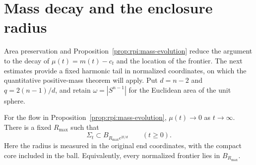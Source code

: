 \section{Mass decay and the enclosure radius}
\label{sec:rpi:flow-estimates}

Area preservation and Proposition~\ref{prop:rpi:mass-evolution} reduce
the argument to the decay of $\mu(t)=m(t)-c_t$ and the location of the
frontier. The next estimates provide a fixed harmonic tail in normalized
coordinates, on which the quantitative positive-mass theorem will apply.
Put $d=n-2$ and $q=2(n-1)/d$, and retain
$\omega=|S^{n-1}|$ for the Euclidean area of the unit sphere.

\begin{proposition}
\label{prop:rpi:flow-estimates}
For the flow in Proposition~\ref{prop:rpi:mass-evolution},
$\mu(t)\to0$ as $t\to\infty$. There is a fixed $R_{\max}$ such that
\begin{equation}\label{eq:rpi:radius-bound}
 \Sigma_t\subset B_{R_{\max}e^{2t/d}}\qquad(t\ge0).
\end{equation}
Here the radius is measured in the original end coordinates, with the
compact core included in the ball. Equivalently, every normalized
frontier lies in $B_{R_{\max}}$.
\end{proposition}

